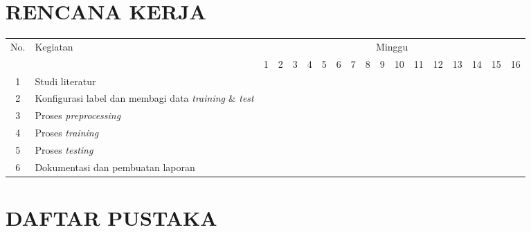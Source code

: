 \documentclass[a4paper]{article}
\begin{document}
	\section{RENCANA KERJA}
	\vspace{-5mm}
	\def\arraystretch{1.5}%
	\begin{table}[h!]
		\begin{tabular}{|c|p{3.5cm}|c|c|c|c|c|c|c|c|c|c|c|c|c|c|c|c|}
			\hline
			\multirow{2}{*}{No.} & \multirow{2}{*}{Kegiatan} & \multicolumn{16}{|c|}{Minggu} \\
			\cline{3-18} &&1&2&3&4&5&6&7&8&9&10&11&12&13&14&15&16 \\
			\hline
			1 & Studi literatur
			&\cellcolor{gray}
			&&&&&&&&&&&&&&& \\
			\hline
			2 & Konfigurasi label dan membagi data \textit{training} \& \textit{test} 
			&
			&\cellcolor{gray}&\cellcolor{gray}
			&&&&&&&&&&&&& \\
			\hline
			3 & Proses \textit{preprocessing} &&&
			&\cellcolor{gray}&\cellcolor{gray}
			&&&&&&&&&&& \\
			\hline
			4 & Proses \textit{training}
			&&&&&
			&\cellcolor{gray}&\cellcolor{gray}
			&\cellcolor{gray}&\cellcolor{gray}
			&\cellcolor{gray}&\cellcolor{gray}
			&\cellcolor{gray}&\cellcolor{gray}
			&&& \\
			\hline
			5 & Proses \textit{testing} 
			&&&&&&&&&&&&&
			&\cellcolor{gray}&\cellcolor{gray}
			&\cellcolor{gray}
			\\
			\hline
			6 & Dokumentasi dan pembuatan laporan  
			&\cellcolor{gray}&\cellcolor{gray}
			&\cellcolor{gray}&\cellcolor{gray}
			&\cellcolor{gray}&\cellcolor{gray}
			&\cellcolor{gray}&\cellcolor{gray}
			&\cellcolor{gray}&\cellcolor{gray}
			&\cellcolor{gray}&\cellcolor{gray}
			&\cellcolor{gray}&\cellcolor{gray}
			&\cellcolor{gray}&\cellcolor{gray} \\
			\hline
		\end{tabular}
	\end{table}

	\newpage
	\section{DAFTAR PUSTAKA}

	\nocite{*}
	
	
\end{document}
